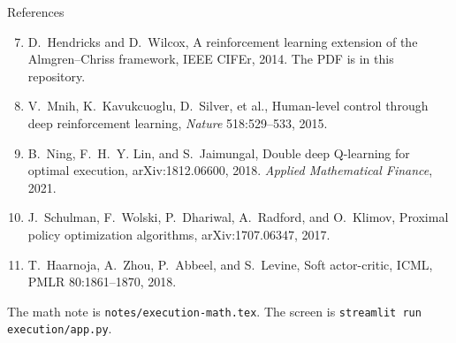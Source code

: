 \documentclass[aspectratio=169,10pt]{beamer}
\newcommand{\currentsource}{}
\newcommand{\framesource}[1]{\gdef\currentsource{#1}}
\begin{document}
\begin{frame}{References}
\framesource{}
\footnotesize
\begin{enumerate}
\setcounter{enumi}{6}
\item D.~Hendricks and D.~Wilcox, A reinforcement learning extension of the Almgren--Chriss framework, IEEE CIFEr, 2014. The PDF is in this repository.
\item V.~Mnih, K.~Kavukcuoglu, D.~Silver, et al., Human-level control through deep reinforcement learning, \emph{Nature} 518:529--533, 2015.
\item B.~Ning, F.~H.~Y. Lin, and S.~Jaimungal, Double deep Q-learning for optimal execution, arXiv:1812.06600, 2018. \emph{Applied Mathematical Finance}, 2021.
\item J.~Schulman, F.~Wolski, P.~Dhariwal, A.~Radford, and O.~Klimov, Proximal policy optimization algorithms, arXiv:1707.06347, 2017.
\item T.~Haarnoja, A.~Zhou, P.~Abbeel, and S.~Levine, Soft actor-critic, ICML, PMLR 80:1861--1870, 2018.
\end{enumerate}
\vspace{0.8em}
{\small The math note is \texttt{notes/execution-math.tex}. The screen is \texttt{streamlit run execution/app.py}.}
\end{frame}
\end{document}
